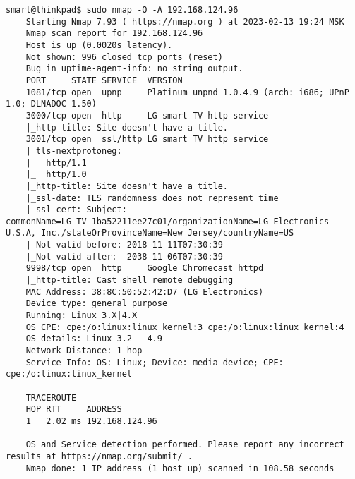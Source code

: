 \begin{Verbatim}[frame=single,breaklines=true,breakanywhere=true]
    smart@thinkpad$ sudo nmap -O -A 192.168.124.96
    Starting Nmap 7.93 ( https://nmap.org ) at 2023-02-13 19:24 MSK
    Nmap scan report for 192.168.124.96
    Host is up (0.0020s latency).
    Not shown: 996 closed tcp ports (reset)
    Bug in uptime-agent-info: no string output.
    PORT     STATE SERVICE  VERSION
    1081/tcp open  upnp     Platinum unpnd 1.0.4.9 (arch: i686; UPnP 1.0; DLNADOC 1.50)
    3000/tcp open  http     LG smart TV http service
    |_http-title: Site doesn't have a title.
    3001/tcp open  ssl/http LG smart TV http service
    | tls-nextprotoneg: 
    |   http/1.1
    |_  http/1.0
    |_http-title: Site doesn't have a title.
    |_ssl-date: TLS randomness does not represent time
    | ssl-cert: Subject: commonName=LG_TV_1ba52211ee27c01/organizationName=LG Electronics U.S.A, Inc./stateOrProvinceName=New Jersey/countryName=US
    | Not valid before: 2018-11-11T07:30:39
    |_Not valid after:  2038-11-06T07:30:39
    9998/tcp open  http     Google Chromecast httpd
    |_http-title: Cast shell remote debugging
    MAC Address: 38:8C:50:52:42:D7 (LG Electronics)
    Device type: general purpose
    Running: Linux 3.X|4.X
    OS CPE: cpe:/o:linux:linux_kernel:3 cpe:/o:linux:linux_kernel:4
    OS details: Linux 3.2 - 4.9
    Network Distance: 1 hop
    Service Info: OS: Linux; Device: media device; CPE: cpe:/o:linux:linux_kernel

    TRACEROUTE
    HOP RTT     ADDRESS
    1   2.02 ms 192.168.124.96

    OS and Service detection performed. Please report any incorrect results at https://nmap.org/submit/ .
    Nmap done: 1 IP address (1 host up) scanned in 108.58 seconds
\end{Verbatim}


